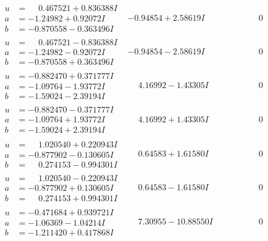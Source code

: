 \documentclass[1p]{elsarticle_modified}
\theoremstyle{definition}
\begin{document}
$$\begin{array}{c|c|c}
\begin{aligned}
u &= \phantom{-}0.467521 + 0.836388 I \\
a &= -1.24982 + 0.92072 I \\
b &= -0.870558 - 0.363496 I\end{aligned}
 & -0.94854 + 2.58619 I & \phantom{-0.000000 } 0 \\ \hline\begin{aligned}
u &= \phantom{-}0.467521 - 0.836388 I \\
a &= -1.24982 - 0.92072 I \\
b &= -0.870558 + 0.363496 I\end{aligned}
 & -0.94854 - 2.58619 I & \phantom{-0.000000 } 0 \\ \hline\begin{aligned}
u &= -0.882470 + 0.371777 I \\
a &= -1.09764 - 1.93772 I \\
b &= -1.59024 - 2.39194 I\end{aligned}
 & \phantom{-}4.16992 - 1.43305 I & \phantom{-0.000000 } 0 \\ \hline\begin{aligned}
u &= -0.882470 - 0.371777 I \\
a &= -1.09764 + 1.93772 I \\
b &= -1.59024 + 2.39194 I\end{aligned}
 & \phantom{-}4.16992 + 1.43305 I & \phantom{-0.000000 } 0 \\ \hline\begin{aligned}
u &= \phantom{-}1.020540 + 0.220943 I \\
a &= -0.877902 - 0.130605 I \\
b &= \phantom{-}0.274153 - 0.994301 I\end{aligned}
 & \phantom{-}0.64583 + 1.61580 I & \phantom{-0.000000 } 0 \\ \hline\begin{aligned}
u &= \phantom{-}1.020540 - 0.220943 I \\
a &= -0.877902 + 0.130605 I \\
b &= \phantom{-}0.274153 + 0.994301 I\end{aligned}
 & \phantom{-}0.64583 - 1.61580 I & \phantom{-0.000000 } 0 \\ \hline\begin{aligned}
u &= -0.471684 + 0.939721 I \\
a &= -1.06369 - 1.04214 I \\
b &= -1.211420 + 0.417868 I\end{aligned}
 & \phantom{-}7.30955 - 10.88550 I & \phantom{-0.000000 } 0 \\ \hline\begin{aligned}

\end{aligned}
\end{array}$$
\end{document}
